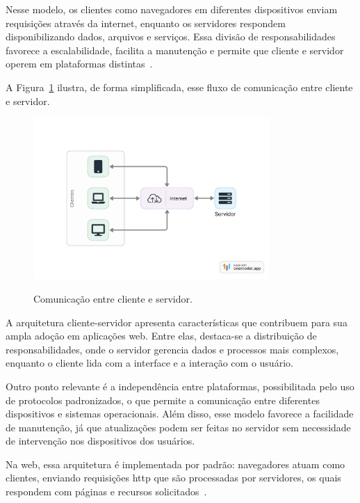 Nesse modelo, os clientes como navegadores em diferentes dispositivos enviam requisições através da internet, enquanto os servidores respondem disponibilizando dados, arquivos e serviços. Essa divisão de responsabilidades favorece a escalabilidade, facilita a manutenção e permite que cliente e servidor operem em plataformas distintas~\cite{fundamentosDevWeb}.

A Figura~\ref{fig:cliente-servidor} ilustra, de forma simplificada, esse fluxo de comunicação entre cliente e servidor.

\begin{figure}[H]
  \centering
  \caption{Comunicação entre cliente e servidor.}
  \includegraphics[width=0.8\textwidth]{media/cliente_servidor.jpeg}
  \label{fig:cliente-servidor}
\end{figure}


A arquitetura cliente-servidor apresenta características que contribuem para sua ampla adoção em aplicações web. Entre elas, destaca-se a distribuição de responsabilidades, onde o servidor gerencia dados e processos mais complexos, enquanto o cliente lida com a interface e a interação com o usuário. 

Outro ponto relevante é a independência entre plataformas, possibilitada pelo uso de protocolos padronizados, o que permite a comunicação entre diferentes dispositivos e sistemas operacionais. Além disso, esse modelo favorece a facilidade de manutenção, já que atualizações podem ser feitas no servidor sem necessidade de intervenção nos dispositivos dos usuários.

Na web, essa arquitetura é implementada por padrão: navegadores atuam como clientes, enviando requisições \acrshort{http} que são processadas por servidores, os quais respondem com páginas e recursos solicitados~\cite{fundamentosDevWeb}.


